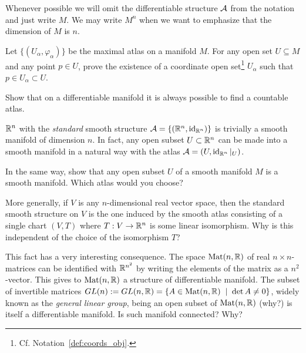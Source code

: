 \begin{notation}
	Whenever possible we will omit the differentiable structure $\mathcal{A}$ from the notation and just write $M$.
	We may write $M^n$ when we want to emphasize that the dimension of $M$ is $n$.
\end{notation}

\begin{exercise}
	Let $\{(U_\alpha, \varphi_\alpha)\}$ be the maximal atlas on a manifold $M$.
	For any open set $U\subseteq M$ and any point $p\in U$, prove the existence of a coordinate open set\footnote{Cf. Notation~\ref{def:coords_obj}.} $U_\alpha$ such that $p\in U_\alpha\subset U$.
\end{exercise}

\begin{exercise}
	Show that on a differentiable manifold it is always possible to find a countable atlas.
\end{exercise}

\begin{exercise}\label{exe:subsetsmanifolds}
	$\mathbb{R}^n$ with the \emph{standard} smooth structure $\mathcal{A}=\{(\mathbb{R}^n, \operatorname{id}_{\mathbb{R}^n})\}$ is trivially a smooth manifold of dimension $n$.
	In fact, any open subset $U\subset\mathbb{R}^n$ can be made into a smooth manifold in a natural way with the atlas $\mathcal{A}=(U, \operatorname{id}_{\mathbb{R}^n}|_U)$.

	In the same way, show that any open subset $U$ of a smooth manifold $M$ is a smooth manifold.
	Which atlas would you choose?

	More generally, if $V$ is any $n$-dimensional real vector space, then the standard smooth structure on $V$ is the one induced by the smooth atlas consisting of a single chart $(V, T)$ where $T: V \to \mathbb{R}^n$ is some linear isomorphism.
	Why is this independent of the choice of the isomorphism $T$?

	This fact has a very interesting consequence.
	The space $\mathrm{Mat}(n, \mathbb{R})$ of real $n\times n$-matrices can be identified with $\mathbb{R}^{n^2}$ by writing the elements of the matrix as a $n^2$-vector.
	This gives to $\mathrm{Mat}(n, \mathbb{R})$ a structure of differentiable manifold.
	The subset of invertible matrices $GL(n) := GL(n, \mathbb{R}) = \{ A \in \mathrm{Mat}(n, \mathbb{R}) \;\mid\; \det A \neq 0\}$, widely known as the \emph{general linear group}, being an open subset of $\mathrm{Mat}(n, \mathbb{R})$ (why?) is itself a differentiable manifold.
	Is such manifold connected? Why?
\end{exercise}

